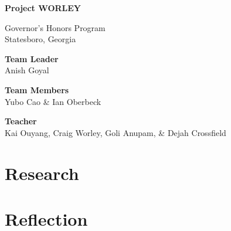 \documentclass{article}
\newcounter{reflection}
\renewcommand{\title}{Project WORLEY}
\begin{document}
\begin{titlepage}
  \centering
  \vspace*{1in}
  {\fontsize{48pt}{\baselineskip}\selectfont \bfseries
  \title}
  \vfill

  \Large
  Governor's Honors Program\\
  Statesboro, Georgia

  \vspace{0.5in}
  \selectfont

  \vspace{1em}
  \textbf{Team Leader}\\ Anish Goyal

  \vspace{1em}
  \textbf{Team Members}\\ Yubo Cao \& Ian Oberbeck

  \vspace{1em}
  \textbf{Teacher}\\ Kai Ouyang, Craig Worley, Goli Anupam, \& Dejah Crossfield
\end{titlepage}
\tableofcontents
\newpage



\part{Research}

\part{Reflection}










 
\nocite{*}
\printbibliography
\end{document}
